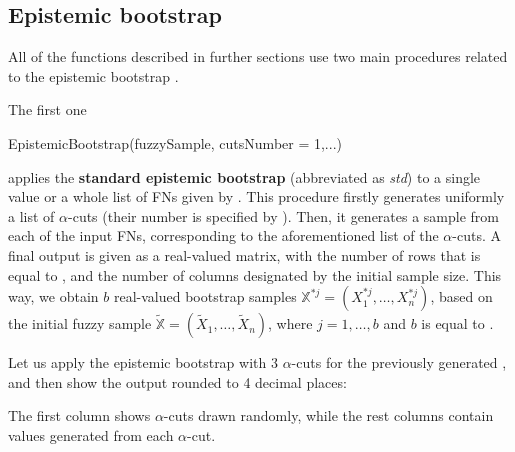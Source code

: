 

\subsection{Epistemic bootstrap}

All of the functions  described in further sections use two main procedures related to the epistemic bootstrap  \citep{grzegorzewski2021,10.1007/978-3-031-08974-9_39,pgmr2022,PGMR2024AMS}.

The first one
\begin{example}
EpistemicBootstrap(fuzzySample, cutsNumber = 1,...)
\end{example}
applies the \textbf{standard epistemic bootstrap} (abbreviated as \emph{std}) to a single value or a whole list of FNs given by .
This procedure firstly generates uniformly a list of $\alpha$-cuts (their number is specified by ). Then, it generates a sample from each of the input FNs, corresponding to the aforementioned list of the $\alpha$-cuts.
A final output is given as a real-valued matrix, with the number of rows that is equal to , and the number of columns designated by the initial sample size.
This way, we obtain $b$ real-valued bootstrap samples $\mathbb{X}^{*j} = \left ( X_1^{*j}, \ldots,  X_n^{*j} \right )$, based on the initial fuzzy sample $\tilde{\mathbb{X}} = ( \tilde{X}_1, \ldots,  \tilde{X}_n)$, where $j=1, \ldots,b$ and $b$ is equal to .

Let us apply the epistemic bootstrap with 3 $\alpha$-cuts for the previously generated , and then show the output rounded to 4 decimal places:
The first column shows $\alpha$-cuts drawn randomly, while the rest columns contain values generated from each $\alpha$-cut.

